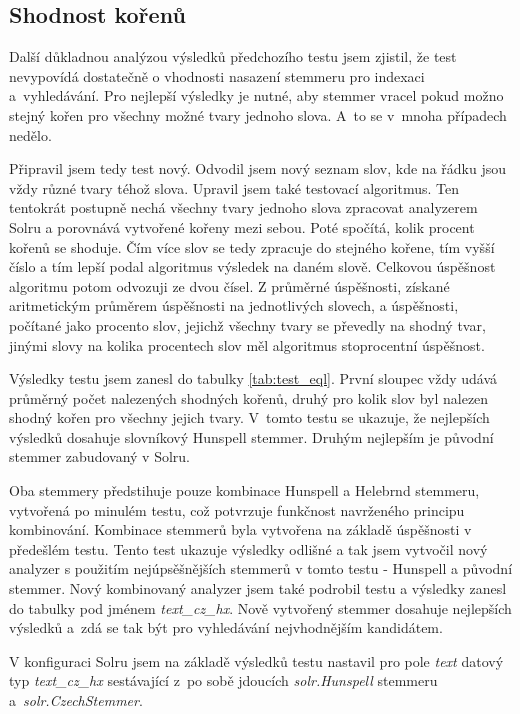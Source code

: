 \subsection{Shodnost kořenů}
Další důkladnou analýzou výsledků předchozího testu jsem zjistil, že test nevypovídá dostatečně o vhodnosti nasazení stemmeru pro indexaci a~vyhledávání. Pro nejlepší výsledky je nutné, aby stemmer vracel pokud možno stejný kořen pro všechny možné tvary jednoho slova. A~to se v~mnoha případech nedělo.

Připravil jsem tedy test nový. Odvodil jsem nový seznam slov, kde na řádku jsou vždy různé tvary téhož slova. Upravil jsem také testovací algoritmus. Ten tentokrát postupně nechá všechny tvary jednoho slova  zpracovat analyzerem Solru a porovnává vytvořené kořeny mezi sebou. Poté spočítá, kolik procent kořenů se shoduje. Čím více slov se tedy zpracuje do stejného kořene, tím vyšší číslo a tím lepší podal algoritmus výsledek na daném slově. Celkovou úspěšnost algoritmu potom odvozuji ze dvou čísel. Z průměrné úspěšnosti, získané aritmetickým průměrem úspěšnosti na jednotlivých slovech, a úspěšnosti, počítané jako procento slov, jejichž všechny tvary se převedly na shodný tvar, jinými slovy na kolika procentech slov měl algoritmus stoprocentní úspěšnost.

Výsledky testu jsem zanesl do tabulky \ref{tab:test_eql}. První sloupec vždy udává průměrný počet nalezených shodných kořenů, druhý pro kolik slov byl nalezen shodný kořen pro všechny jejich tvary. V~tomto testu se ukazuje, že nejlepších výsledků dosahuje slovníkový Hunspell stemmer. Druhým nejlepším je původní stemmer zabudovaný v Solru.

Oba stemmery předstihuje pouze kombinace Hunspell a Helebrnd stemmeru, vytvořená po minulém testu, což potvrzuje funkčnost navrženého principu kombinování. Kombinace stemmerů byla vytvořena na základě úspěšnosti v předešlém testu. Tento test ukazuje výsledky odlišné a tak jsem vytvočil nový analyzer s použitím nejúpsěšnějších stemmerů v tomto testu - Hunspell a původní stemmer. Nový kombinovaný analyzer jsem také podrobil testu a výsledky zanesl do tabulky pod jménem \emph{text\_cz\_hx}. Nově vytvořený stemmer dosahuje nejlepších výsledků a~zdá se tak být pro vyhledávání nejvhodnějším kandidátem.

V konfiguraci Solru jsem na základě výsledků testu nastavil pro pole \emph{text} datový typ \emph{text\_cz\_hx} sestávající z~po sobě jdoucích \emph{solr.Hunspell} stemmeru a~\emph{solr.CzechStemmer}.

